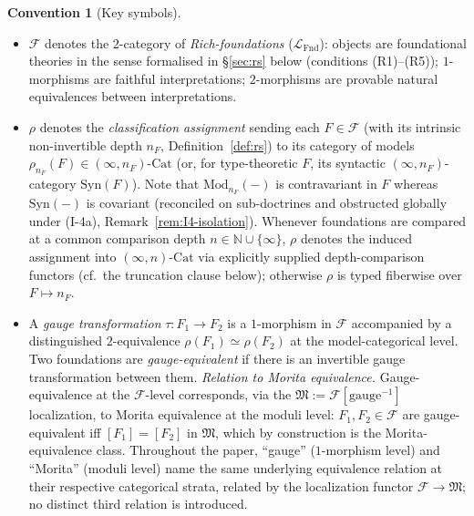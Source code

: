 \documentclass[11pt]{article}
\theoremstyle{plain}
\theoremstyle{definition}
\newtheorem{convention}[theorem]{Convention}
\newcommand{\cF}{\mathcal{F}}
\newcommand{\fM}{\mathfrak{M}}
\newcommand{\LFnd}{\mathcal{L}_{\mathrm{Fnd}}}
\newcommand{\Cat}{\mathrm{Cat}}
\newcommand{\Syn}{\mathrm{Syn}}
\newcommand{\Mod}{\mathrm{Mod}}
\begin{document}
\begin{convention}[Key symbols]\label{conv:notation}
\begin{itemize}
\item $\cF$ denotes the $2$-category of \emph{Rich-foundations} ($\LFnd$): objects are foundational theories in the sense formalised in \S\ref{sec:rs} below (conditions (R1)--(R5)); $1$-morphisms are faithful interpretations; $2$-morphisms are provable natural equivalences between interpretations.
\item $\rho$ denotes the \emph{classification assignment} sending each $F \in \cF$ (with its intrinsic non-invertible depth $n_F$, Definition~\ref{def:rs}) to its category of models $\rho_{n_F}(F) \in (\infty, n_F)\text{-}\Cat$ (or, for type-theoretic $F$, its syntactic $(\infty, n_F)$-category $\Syn(F)$). Note that $\Mod_{n_F}(-)$ is contravariant in $F$ whereas $\Syn(-)$ is covariant (reconciled on sub-doctrines and obstructed globally under \textup{(I-4a)}, Remark~\ref{rem:I4-isolation}). Whenever foundations are compared at a common comparison depth $n \in \mathbb{N} \cup \{\infty\}$, $\rho$ denotes the induced assignment into $(\infty, n)\text{-}\Cat$ via explicitly supplied depth-comparison functors (cf.\ the truncation clause below); otherwise $\rho$ is typed fiberwise over $F \mapsto n_F$.
\item A \emph{gauge transformation} $\tau : F_1 \to F_2$ is a $1$-morphism in $\cF$ accompanied by a distinguished $2$-equivalence $\rho(F_1) \simeq \rho(F_2)$ at the model-categorical level. Two foundations are \emph{gauge-equivalent} if there is an invertible gauge transformation between them. \emph{Relation to Morita equivalence.} Gauge-equivalence at the $\cF$-level corresponds, via the $\fM := \cF[\mathrm{gauge}^{-1}]$ localization, to Morita equivalence at the moduli level: $F_1, F_2 \in \cF$ are gauge-equivalent iff $[F_1] = [F_2]$ in $\fM$, which by construction is the Morita-equivalence class. Throughout the paper, ``gauge'' ($1$-morphism level) and ``Morita'' (moduli level) name the same underlying equivalence relation at their respective categorical strata, related by the localization functor $\cF \to \fM$; no distinct third relation is introduced.

\end{itemize}
\end{convention}
\end{document}
